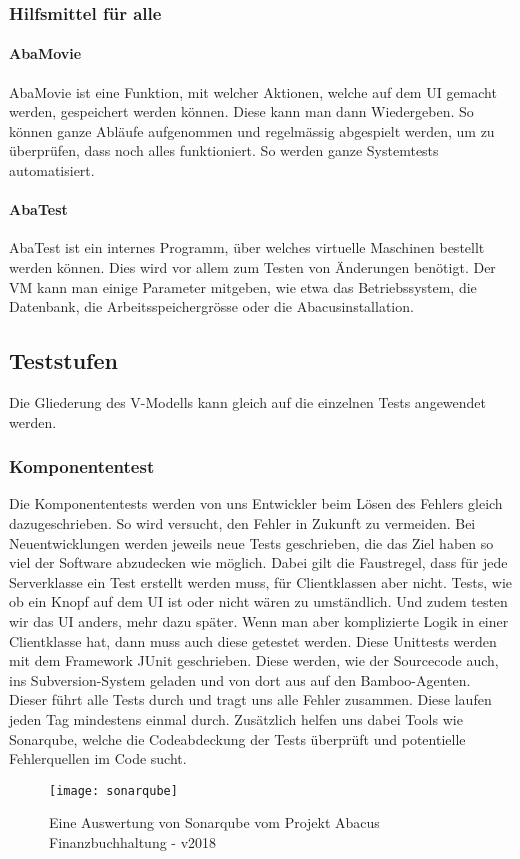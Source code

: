 \subsubsection{Hilfsmittel für alle}
\paragraph{AbaMovie}
AbaMovie ist eine Funktion, mit welcher Aktionen, welche auf dem UI gemacht werden, gespeichert werden können. Diese kann man dann Wiedergeben. So können ganze Abläufe aufgenommen und regelmässig abgespielt werden, um zu überprüfen, dass noch alles funktioniert. So werden ganze Systemtests automatisiert.
\paragraph{AbaTest}
AbaTest ist ein internes Programm, über welches virtuelle Maschinen bestellt werden können. Dies wird vor allem zum Testen von Änderungen benötigt. Der VM kann man einige Parameter mitgeben, wie etwa das Betriebssystem, die Datenbank, die Arbeitsspeichergrösse oder die Abacusinstallation.

\subsection{Teststufen}
Die Gliederung des V-Modells kann gleich auf die einzelnen Tests angewendet werden.
\subsubsection{Komponententest}
Die Komponententests werden von uns Entwickler beim Lösen des Fehlers gleich dazugeschrieben. So wird versucht, den Fehler in Zukunft zu vermeiden. Bei Neuentwicklungen werden jeweils neue Tests geschrieben, die das Ziel haben so viel der Software abzudecken wie möglich. Dabei gilt die Faustregel, dass für jede Serverklasse ein Test erstellt werden muss, für Clientklassen aber nicht. Tests, wie ob ein Knopf auf dem UI ist oder nicht wären zu umständlich. Und zudem testen wir das UI anders, mehr dazu später. Wenn man aber komplizierte Logik in einer Clientklasse hat, dann muss auch diese getestet werden. Diese Unittests werden mit dem Framework JUnit geschrieben. Diese werden, wie der Sourcecode auch, ins Subversion-System geladen und von dort aus auf den Bamboo-Agenten. Dieser führt alle Tests durch und tragt uns alle Fehler zusammen. Diese laufen jeden Tag mindestens einmal durch. Zusätzlich helfen uns dabei Tools wie Sonarqube, welche die Codeabdeckung der Tests überprüft und potentielle Fehlerquellen im Code sucht.
\begin{figure}[H]
	\centering
	\texttt{[image: sonarqube]}
	\caption{Eine Auswertung von Sonarqube vom Projekt Abacus Finanzbuchhaltung - v2018}
\end{figure}
